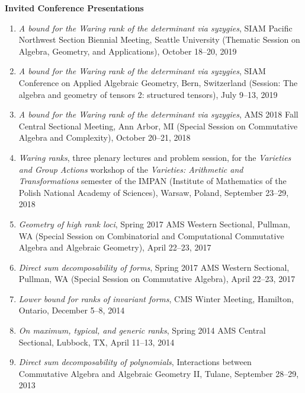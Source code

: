 \documentclass[12pt]{article}
\begin{document}
\textbf{Invited Conference Presentations}
\begin{enumerate}[revarabic]

\item \textit{A bound for the Waring rank of the determinant via syzygies},
SIAM Pacific Northwest Section Biennial Meeting, Seattle University
(Thematic Session on Algebra, Geometry, and Applications),
October 18--20, 2019

\item \textit{A bound for the Waring rank of the determinant via syzygies},
SIAM Conference on Applied Algebraic Geometry, Bern, Switzerland
(Session: The algebra and geometry of tensors 2: structured tensors),
July 9--13, 2019

\item \textit{A bound for the Waring rank of the determinant via syzygies},
AMS 2018 Fall Central Sectional Meeting, Ann Arbor, MI
(Special Session on Commutative Algebra and Complexity),
October 20--21, 2018

\item \textit{Waring ranks},
three plenary lectures and problem session,
for the \emph{Varieties and Group Actions} workshop of the \emph{Varieties: Arithmetic and Transformations}
semester of the IMPAN (Institute of Mathematics of the Polish National Academy of Sciences),
Warsaw, Poland, September 23--29, 2018

\item \textit{Geometry of high rank loci},
Spring 2017 AMS Western Sectional, Pullman, WA
(Special Session on Combinatorial and Computational Commutative Algebra and Algebraic Geometry),
April 22--23, 2017

\item \textit{Direct sum decomposability of forms},
Spring 2017 AMS Western Sectional, Pullman, WA
(Special Session on Commutative Algebra),
April 22--23, 2017

\item \textit{Lower bound for ranks of invariant forms},
CMS Winter Meeting, Hamilton, Ontario,
December 5--8, 2014

\item \textit{On maximum, typical, and generic ranks},
Spring 2014 AMS Central Sectional, Lubbock, TX,
April 11--13, 2014

\item \textit{Direct sum decomposability of polynomials},
Interactions between Commutative Algebra and Algebraic Geometry II,
Tulane,
September 28--29, 2013


\end{enumerate}
\end{document}

